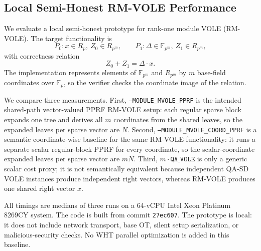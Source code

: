 \subsection{Local Semi-Honest RM-VOLE Performance}
\label{sec:module-mvole-performance}

We evaluate a local semi-honest prototype for rank-one module VOLE (RM-VOLE). The target functionality is
\[
  P_0: x \in R_p,\ Z_0 \in R_{p^m}, \qquad
  P_1: \Delta \in \mathbb{F}_{p^m},\ Z_1 \in R_{p^m},
\]
with correctness relation
\[
  Z_0 + Z_1 = \Delta \cdot x.
\]
The implementation represents elements of \(\mathbb{F}_{p^m}\) and \(R_{p^m}\) by \(m\) base-field coordinates over \(\mathbb{F}_p\), so the verifier checks the coordinate image of the relation.

We compare three measurements. First, \texttt{--MODULE\_MVOLE\_PPRF} is the intended shared-path vector-valued PPRF RM-VOLE setup: each regular sparse block expands one tree and derives all \(m\) coordinates from the shared leaves, so the expanded leaves per sparse vector are \(N\). Second, \texttt{--MODULE\_MVOLE\_COORD\_PPRF} is a semantic coordinate-wise baseline for the same RM-VOLE functionality: it runs a separate scalar regular-block PPRF for every coordinate, so the scalar-coordinate expanded leaves per sparse vector are \(mN\). Third, \(m\cdot\texttt{QA\_VOLE}\) is only a generic scalar cost proxy; it is not semantically equivalent because independent QA-SD VOLE instances produce independent right vectors, whereas RM-VOLE produces one shared right vector \(x\).

All timings are medians of three runs on a 64-vCPU Intel Xeon Platinum 8269CY system. The code is built from commit \texttt{27ec607}. The prototype is local: it does not include network transport, base OT, silent setup serialization, or malicious-security checks. No WHT parallel optimization is added in this baseline.

